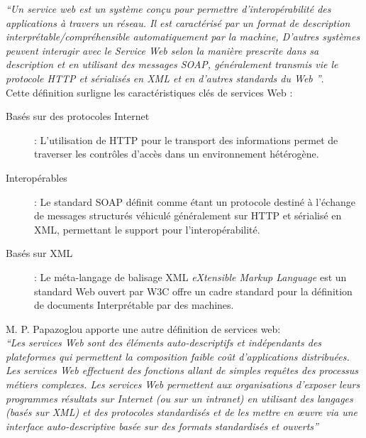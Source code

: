 	\emph{``Un service web est un système conçu pour permettre d'interopérabilité des applications à travers un réseau. 
	    Il est caractérisé par un format de description interprétable/compréhensible automatiquement par la machine,
	    D'autres systèmes peuvent interagir avec le Service Web selon la manière prescrite dans sa description et en
	    utilisant des messages SOAP, généralement transmis vie le protocole HTTP et sérialisés en XML et en d'autres 
	    standards du Web ''}.\\

	Cette définition surligne les caractéristiques clés de services Web \cite{fremantle2002enterprise}:

	\begin{description} %
	    \item[Basés sur des protocoles Internet] : 
		L'utilisation de \textsc{HTTP} pour le transport des informations permet de traverser les contrôles
		d'accès dans un environnement hétérogène.

	    \item[Interopérables] : 
		Le standard \textsc{SOAP} \cite{box2000simple} définit comme étant un protocole destiné à l'échange 
		de messages structurés véhiculé généralement sur \textsc{HTTP} et sérialisé en \textsc{XML}, 
		permettant le support pour l'interopérabilité.

	    \item[Basés sur XML] : 
		Le méta-langage de balisage \textsc{XML} \textit{eXtensible Markup Language} est un standard Web ouvert 
		par \textsc{W3C} \cite{bray1998extensible} offre un cadre standard pour la définition de documents 
		Interprétable par des machines.
	\end{description}
	\newpage
	M. P. Papazoglou \cite{papazoglou2003service} apporte une autre définition de services web:\\

	\emph{``Les services Web sont des éléments auto-descriptifs et indépendants des plateformes qui permettent 
	    la composition faible coût d’applications distribuées. Les services Web effectuent des fonctions allant 
	    de simples requêtes des processus métiers complexes. Les services Web permettent aux organisations d’exposer 
	    leurs programmes résultats sur Internet (ou sur un intranet) en utilisant des langages (basés sur XML)
	    et des protocoles standardisés et de les mettre en œuvre via une interface auto-descriptive basée sur 
	    des formats standardisés et ouverts''}\\

